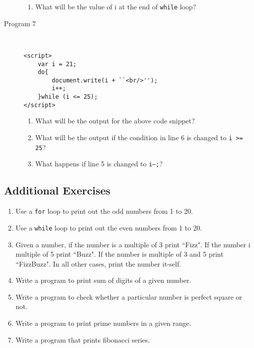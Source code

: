 \documentclass[11pt,a4paper]{article}
\def\AnswerBox{\fbox{\begin{minipage}{4in}\hfill\vspace{0.5in}\end{minipage}}}
\begin{document}
\begin{description}
\AnswerBox

\begin{enumerate}[label=\bfseries Q\arabic*:]\itemsep10pt
\item What will be the value of i at the end of \texttt{while} loop?
\end{enumerate}

\item [Program 7]\
\begin{lstlisting}
<script>  
    var i = 21;  
    do{  
        document.write(i + ``<br/>'');  
        i++;  
    }while (i <= 25);  
</script>  
\end{lstlisting}
\AnswerBox

\begin{enumerate}[label=\bfseries Q\arabic*:]\itemsep10pt
\item What will be the output for the above code snippet?
\item What will be the output if the condition in line 6 is changed to \texttt{i >= 25}?
\item What happens if line 5 is changed to \texttt{i--;}?
\end{enumerate}

\end{description}
\subsection*{Additional Exercises}
\begin{enumerate}
\item Use a \texttt{for} loop to print out the odd numbers from 1 to 20.
\item Use a \texttt{while} loop to print out the even numbers from 1 to 20.
\item Given a number, if the number is a multiple of 3 print ``Fizz". If the number i multiple of 5 print ``Buzz". If the number is multiple of 3 and 5 print ``FizzBuzz". In all other cases, print the number it-self.
\item  Write a program to print sum of digits of a given number. 
\item Write a program to check whether a particular number is perfect square or not.
\item Write a program to print prime numbers in a given range.
\item Write a program that prints fibonacci series.
\end{enumerate}
\end{document}
